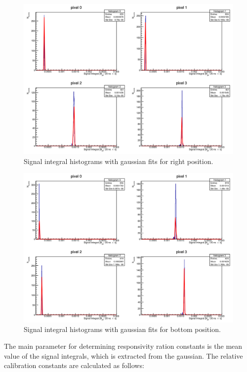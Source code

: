 \begin{figure}[H]
 \centering
 \includegraphics[scale=0.35, angle = 0]{./pictures/right.png}
 \caption{Signal integral histograms with gaussian fits for right position.}
 \label{rightCal}
 
\end{figure}
\begin{figure}[H]
 \centering
 \includegraphics[scale=0.35, angle = 0]{./pictures/bottom.png}
 \caption{Signal integral histograms with gaussian fits for bottom position.}
 \label{bottomCal}
 
\end{figure}


The main parameter for determining responsivity ration constants is the mean value of the signal integrals, which is extracted from the gaussian. The relative calibration constants are calculated as follows:

